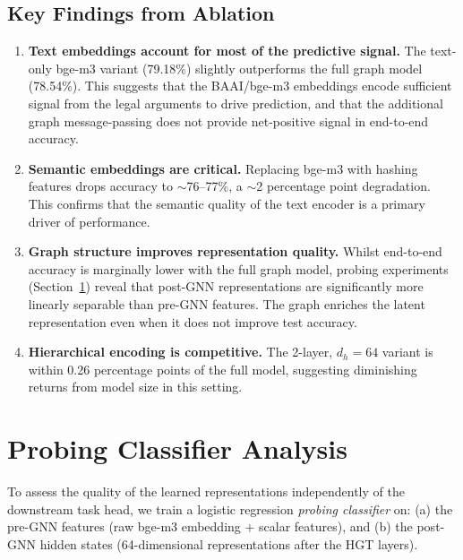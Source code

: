 \documentclass[12pt,a4paper]{report}
\begin{document}
\subsection{Key Findings from Ablation}

\begin{enumerate}
  \item \textbf{Text embeddings account for most of the predictive signal.} The text-only bge-m3 variant (79.18\%) slightly outperforms the full graph model (78.54\%). This suggests that the BAAI/bge-m3 embeddings encode sufficient signal from the legal arguments to drive prediction, and that the additional graph message-passing does not provide net-positive signal in end-to-end accuracy.

  \item \textbf{Semantic embeddings are critical.} Replacing bge-m3 with hashing features drops accuracy to $\sim$76--77\%, a $\sim$2 percentage point degradation. This confirms that the semantic quality of the text encoder is a primary driver of performance.

  \item \textbf{Graph structure improves representation quality.} Whilst end-to-end accuracy is marginally lower with the full graph model, probing experiments (Section~\ref{sec:probing}) reveal that post-GNN representations are significantly more linearly separable than pre-GNN features. The graph enriches the latent representation even when it does not improve test accuracy.

  \item \textbf{Hierarchical encoding is competitive.} The 2-layer, $d_h=64$ variant is within 0.26 percentage points of the full model, suggesting diminishing returns from model size in this setting.
\end{enumerate}

\section{Probing Classifier Analysis}
\label{sec:probing}

To assess the quality of the learned representations independently of the downstream task head, we train a logistic regression \textit{probing classifier} on: (a) the pre-GNN features (raw bge-m3 embedding + scalar features), and (b) the post-GNN hidden states (64-dimensional representations after the HGT layers).
\end{document}
